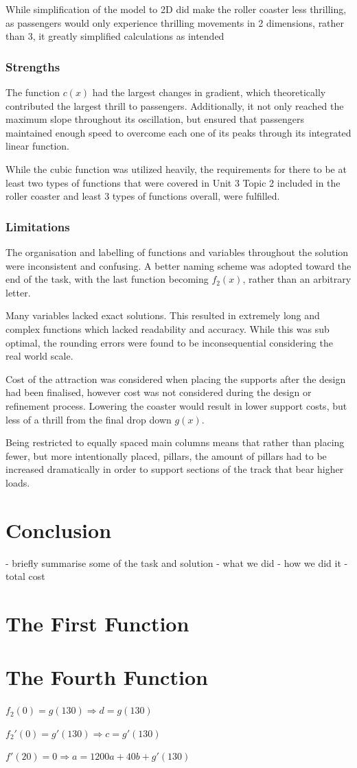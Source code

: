 \documentclass[11pt, letterpaper]{article}
\begin{document}
While simplification of the model to 2D did make the roller coaster less thrilling, as passengers would only experience thrilling movements in 2 dimensions, rather than 3, it greatly simplified calculations as intended


\subsubsection{Strengths}


The function $c(x)$ had the largest changes in gradient, which theoretically contributed the largest thrill to passengers. Additionally, it not only reached the maximum slope throughout its oscillation, but ensured that passengers maintained enough speed to overcome each one of its peaks through its integrated linear function.

While the cubic function was utilized heavily, the requirements for there to be at least two types of functions that were covered in Unit 3 Topic 2 included in the roller coaster and least 3 types of functions overall, were fulfilled.



\subsubsection{Limitations}


The organisation and labelling of functions and variables throughout the solution were inconsistent and confusing. A better naming scheme was adopted toward the end of the task, with the last function becoming $f_2(x)$, rather than an arbitrary letter. 

Many variables lacked exact solutions. This resulted in extremely long and complex functions which lacked readability and accuracy. While this was sub optimal, the rounding errors were found to be inconsequential considering the real world scale.

Cost of the attraction was considered when placing the supports after the design had been finalised, however cost was not considered during the design or refinement process. Lowering the coaster would result in lower support costs, but less of a thrill from the final drop down $g(x)$.

Being restricted to equally spaced main columns means that rather than placing fewer, but more intentionally placed, pillars, the amount of pillars had to be increased dramatically in order to support sections of the track that bear higher loads.
\section{Conclusion}
- briefly summarise some of the task and solution
- what we did
- how we did it
- total cost 

\begin{appendices}
	\section{The First Function}
	
	
	\section{The Fourth Function}
	$f_2(0)=g(130)\Rightarrow d=g(130)$
	
	$f_2'(0) = g'(130)\Rightarrow c=g'(130)$
	
	$f'(20)=0\Rightarrow a=1200a+40b+g'(130)$
	
	
\end{appendices}
\end{document}

